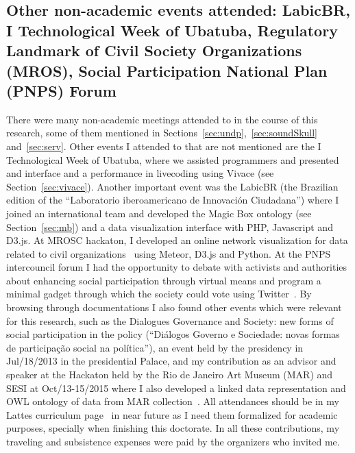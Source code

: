 \begin{apendicesenv}
\section{Other non-academic events attended: LabicBR, I Technological Week of Ubatuba, Regulatory Landmark of Civil Society Organizations (MROS), Social Participation National Plan (PNPS) Forum}
There were many non-academic meetings attended to in the course of this research,
some of them mentioned in Sections~\ref{sec:undp},~\ref{sec:soundSkull} and~\ref{sec:serv}.
Other events I attended to that are not mentioned are the I Technological Week of Ubatuba, where
we assisted programmers and presented and interface and a performance in livecoding using Vivace (see Section~\ref{sec:vivace}).
Another important event was the LabicBR (the Brazilian edition of the ``Laboratorio iberoamericano de Innovación Ciudadana'')
where I joined an international team and developed the Magic Box ontology (see Section~\ref{sec:mb}) and a data visualization interface
with PHP, Javascript and D3.js.
At MROSC hackaton, I developed an online network visualization for data related to civil organizations~\cite{oscEmRede} using
Meteor, D3.js and Python.
At the PNPS intercouncil forum I had the opportunity to debate with activists and authorities about enhancing social participation
through virtual means and program a minimal gadget through which the society could vote using Twitter~\cite{votoTwitter}.
By browsing through documentations I also found other events which were relevant for this research,
such as the
Dialogues Governance and Society: new forms of social participation in the policy
(``Diálogos Governo e Sociedade: novas formas de participação social na política''),
an event held by the presidency in Jul/18/2013 in the presidential Palace,
and my contribution as an advisor and speaker at the Hackaton held by the Rio de Janeiro Art Museum (MAR)
and SESI at Oct/13-15/2015 where I also developed a linked data representation and OWL ontology of data from MAR collection~\cite{hackmar}.
All attendances should be in my Lattes curriculum page~\cite{myLattes} in near future as
I need them formalized for academic purposes, specially when finishing this doctorate.
In all these contributions, my traveling and subsistence expenses were paid by the organizers who invited me.


\end{apendicesenv}

